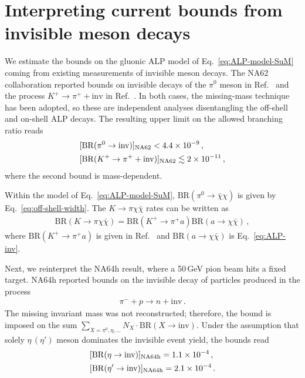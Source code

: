 \documentclass[aps,prd,preprintnumbers,superscriptaddress,nofootinbib,floatfix,twocolumn,notitlepage,reprint]{revtex4-2}
\newcommand{\BR}{\mathrm{BR}}
\begin{document}
\section{Interpreting current bounds from invisible meson decays}
\label{app:na64h}

We estimate the bounds on the gluonic ALP model of Eq.~\eqref{eq:ALP-model-SuM} coming from existing measurements of invisible meson decays.
The NA62 collaboration reported bounds on invisible decays of the $\pi^{0}$ meson in Ref.~\cite{NA62:2020pwi} and the process $K^{+}\to \pi^{+}+\text{inv}$ in Ref.~\cite{NA62:2025upx}. 
In both cases, the missing-mass technique has been adopted, so these are independent analyses disentangling the off-shell and on-shell ALP decays.
The resulting upper limit on the allowed branching ratio reads
%
\begin{align}
    &[\BR(\pi^{0}\to \rm{inv})]_{\text{NA62}}
    <
    4.4\times 10^{-9}\,,\\ 
    &[\BR(K^{+}\to \pi^{+}+\rm{inv})]_{\text{NA62}}
    \lesssim 
    2\times 10^{-11}\, ,
\end{align}
%
where the second bound is mass-dependent. 

Within the model of Eq.~\eqref{eq:ALP-model-SuM}, $\BR(\pi^{0}\to \bar{\chi}\chi)$ is given by Eq.~\eqref{eq:off-shell-width}. 
The $K\to \pi \chi\bar{\chi}$ rates can be written as
%
\begin{align}
    \BR(K\to \pi \chi\bar{\chi}) 
    = \BR(K^{+}\to \pi^{+}a) \BR(a\to \chi\bar{\chi})\,,
\end{align}
%
where $\BR(K^{+}\to \pi^{+}a)$ is given in Ref.~\cite{Bauer:2021wjo} and $\BR(a\to \chi\bar{\chi})$ is Eq.~\eqref{eq:ALP-inv}.

Next, we reinterpret the NA64h result, where a 50\,GeV pion beam hits a fixed target. NA64h reported bounds on the invisible decay of particles produced in the process~\cite{NA64:2024mah}
%
\begin{align}
    \label{eq:NA64-process}
    \pi^{-}+p\to n+\text{inv} \, .
\end{align}
%
The missing invariant mass was not reconstructed; therefore, the bound is imposed on the sum $\sum_{X = \pi^{0},\eta,\dots}N_{X}\cdot \BR(X\to \text{inv})$. 
Under the assumption that solely $\eta\,(\eta')$ meson dominates the invisible event yield, the bounds read
\begin{align}
    \label{eq:NA64h-eta}
    &[\BR(\eta\to \text{inv})]_{\rm NA64h}=1.1\times 10^{-4}\, , \\ 
    \label{eq:NA64h-etapr}
    &[\BR(\eta'\to \text{inv})]_{\rm NA64h}=2.1\times 10^{-4}\, .  
\end{align}
\end{document}
